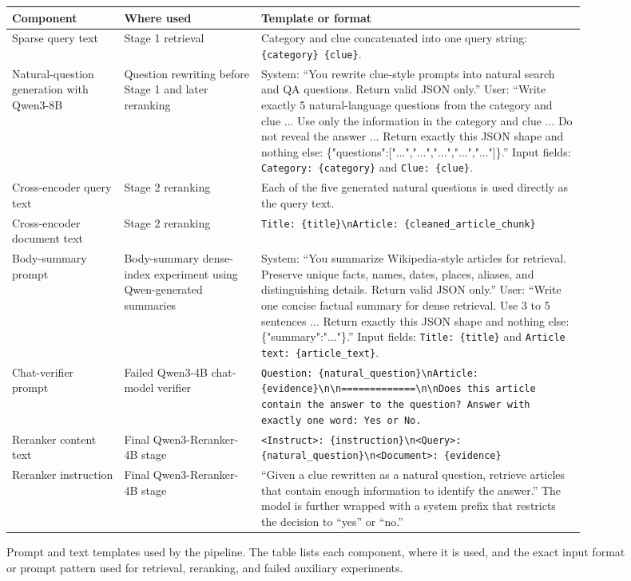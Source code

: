 \documentclass[11pt]{article}
\begin{document}
\begin{figure}[h]
\centering
\scriptsize
\caption{Prompt and text templates used by the pipeline. The table lists each component, where it is used, and the exact input format or prompt pattern used for retrieval, reranking, and failed auxiliary experiments.}
\label{fig:prompt-templates}
\begin{tabular}{p{0.18\linewidth} p{0.22\linewidth} p{0.52\linewidth}}
\toprule
\textbf{Component} & \textbf{Where used} & \textbf{Template or format} \\
\midrule
Sparse query text & Stage 1 retrieval & Category and clue concatenated into one query string: \texttt{\{category\} \{clue\}}. \\
\addlinespace
Natural-question generation with Qwen3-8B & Question rewriting before Stage 1 and later reranking & System: ``You rewrite clue-style prompts into natural search and QA questions. Return valid JSON only.'' User: ``Write exactly 5 natural-language questions from the category and clue ... Use only the information in the category and clue ... Do not reveal the answer ... Return exactly this JSON shape and nothing else: \{"questions":["...","...","...","...","..."]\}.'' Input fields: \texttt{Category: \{category\}} and \texttt{Clue: \{clue\}}. \\
\addlinespace
Cross-encoder query text & Stage 2 reranking & Each of the five generated natural questions is used directly as the query text. \\
\addlinespace
Cross-encoder document text & Stage 2 reranking & \texttt{Title: \{title\}\textbackslash nArticle: \{cleaned\_article\_chunk\}} \\
\addlinespace
Body-summary prompt & Body-summary dense-index experiment using Qwen-generated summaries & System: ``You summarize Wikipedia-style articles for retrieval. Preserve unique facts, names, dates, places, aliases, and distinguishing details. Return valid JSON only.'' User: ``Write one concise factual summary for dense retrieval. Use 3 to 5 sentences ... Return exactly this JSON shape and nothing else: \{"summary":"..."\}.'' Input fields: \texttt{Title: \{title\}} and \texttt{Article text: \{article\_text\}}. \\
\addlinespace
Chat-verifier prompt & Failed Qwen3-4B chat-model verifier & \texttt{Question: \{natural\_question\}\textbackslash nArticle: \{evidence\}\textbackslash n\textbackslash n=============\textbackslash n\textbackslash nDoes this article contain the answer to the question? Answer with exactly one word: Yes or No.} \\
\addlinespace
Reranker content text & Final Qwen3-Reranker-4B stage & \texttt{<Instruct>: \{instruction\}\textbackslash n<Query>: \{natural\_question\}\textbackslash n<Document>: \{evidence\}} \\
\addlinespace
Reranker instruction & Final Qwen3-Reranker-4B stage & ``Given a clue rewritten as a natural question, retrieve articles that contain enough information to identify the answer.'' The model is further wrapped with a system prefix that restricts the decision to ``yes'' or ``no.'' \\
\bottomrule
\end{tabular}
\end{figure}
\end{document}

